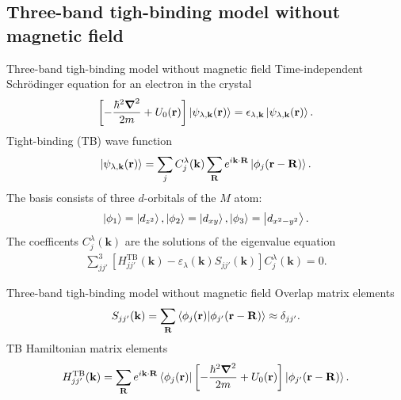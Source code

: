 \documentclass[aspectratio=169,compress,x11names]{beamer}
\begin{document}
	\subsection{Three-band tigh-binding model without magnetic field}
	\begin{frame}{Three-band tigh-binding model without magnetic field}
		Time-independent Schr\"{o}dinger equation for an electron in the crystal
		\begin{gather}
			\left[-\frac{\hbar^{2} \boldsymbol{\nabla}^{2}}{2m} + U_{0}(\mathbf{r})\right] \ket{\psi_{\lambda,\mathbf{k}}(\mathbf{r})} = \epsilon_{\lambda,\mathbf{k}} \ket{\psi_{\lambda,\mathbf{k}}(\mathbf{r})}.
		\end{gather}
		Tight-binding (TB) wave function
		\begin{gather}
			\ket{\psi_{\lambda,\mathbf{k}}(\mathbf{r})} = \sum_{j} C_{j}^{\lambda}(\mathbf{k}) \sum_{\mathbf{R}} e^{i \mathbf{k} \cdot \mathbf{R}} \ket{\phi_{j} (\mathbf{r} - \mathbf{R})}.
		\end{gather}
		The basis consists of three $d$-orbitals of the $M$ atom:
		\begin{gather}
			\ket{\phi_{1}} = \ket{d_{z^{2}}} , 
			\ket{\phi_{2}} = \ket{d_{xy}} , 
			\ket{\phi_{3}} = \ket{d_{x^{2} - y^{2}}}.
		\end{gather}
		The coefficents $C_{j}^{\lambda}(\mathbf{k})$ are the solutions of the eigenvalue equation
		\begin{gather}
			\sum_{jj'}^{3} \left[H_{jj'}^{\text{TB}}(\mathbf{k}) - \varepsilon_{\lambda}(\mathbf{k}) S_{jj'}(\mathbf{k})\right] C_{j}^{\lambda}(\mathbf{k}) = 0.
		\end{gather}
	\end{frame}
	\begin{frame}{Three-band tigh-binding model without magnetic field}
		Overlap matrix elements
		\begin{gather}
			S_{jj'}(\mathbf{k}) = \sum_{\mathbf{R}} \bra{\phi_{j}(\mathbf{r})} \ket{\phi_{j'}(\mathbf{r - R})} \approx \delta_{jj'}.
		\end{gather}
		TB Hamiltonian matrix elements
		\begin{gather}
			H_{jj'}^{\text{TB}}(\mathbf{k}) = \sum_{\mathbf{R}} e^{i \mathbf{k \cdot R}} \bra{\phi_{j}(\mathbf{r})} \left[-\frac{\hbar^{2} \boldsymbol{\nabla}^{2}}{2m} + U_{0}(\mathbf{r})\right] \ket{\phi_{j'}(\mathbf{r - R})}.
		\end{gather}
	\end{frame}
\end{document}
